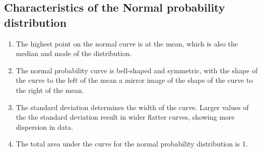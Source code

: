 \documentclass[12pt]{article}
\begin{document}
\subsection*{Characteristics of the Normal probability distribution}

\begin{enumerate}
\item The highest point on the normal curve is at the mean, which is also the median and mode of the distribution.

\item The normal probability curve is bell-shaped and symmetric, with the shape of the curve to the left of the mean a mirror image of the shape of the curve to the right of the mean.

\item The standard deviation determines the width of the curve. Larger values of the the standard deviation result in wider flatter curves, showing more dispersion in data.

\item The total area under the curve for the normal probability distribution is 1.
\end{enumerate}
\end{document}
